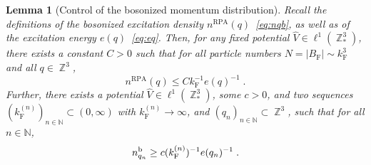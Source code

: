 \documentclass[12pt,a4paper]{article}
\numberwithin{equation}{section}
\newcommand{\NNN}{\mathbb{N}}
\newcommand{\1}{\mathbb{I}}
\renewcommand{\b}{\textnormal{b}}
\newcommand{\F}{\mathrm{F}}
\newcommand{\RPA}{\mathrm{RPA}}
\DeclareMathOperator{\Z}{\mathbb{Z}}
\theoremstyle{plain}
\newtheorem{lemma}[theorem]{Lemma}
\theoremstyle{definition}
\theoremstyle{remark}
\theoremstyle{plain}
\theoremstyle{definition}
\theoremstyle{remark}
\begin{document}
\begin{lemma}[Control of the bosonized momentum distribution] \label{lem:nqb_bounds}
Recall the definitions of the bosonized excitation density $ n^{\RPA}(q) $~\eqref{eq:nqb}, as well as of the excitation energy $ e(q) $~\eqref{eq:eq}. Then, for any fixed potential $ \hat{V} \in \ell^1(\Z^3_*) $, there exists a constant $ C > 0 $ such that for all particle numbers $ N = |B_{\F}| \sim k_{\F}^3 $ and all $ q \in \Z^3 $,
\begin{equation} \label{eq:nqb_upperbound}
	n^{\RPA}(q)
	\le C k_{\F}^{-1} e(q)^{-1} \;.
\end{equation}
Further, there exists a potential $ \hat{V} \in \ell^1(\Z^3_*) $, some $ c > 0 $, and two sequences $ (k_{\F}^{(n)})_{n \in \NNN} \subset (0,\infty) $ with $ k_{\F}^{(n)} \to \infty $, and $ (q_n)_{n \in \NNN} \subset \Z^3 $, such that for all $ n \in \NNN $,
\begin{equation} \label{eq:nqb_lowerbound}
	n_{q_n}^{\b}
	\ge c (k_{\F}^{(n)})^{-1} e(q_n)^{-1} \;.
\end{equation}
\end{lemma}
\end{document}
